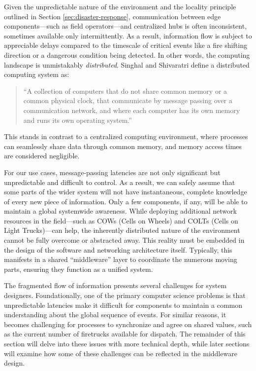 \documentclass[]             %
{NASA}                       %
\theoremstyle{definition}
\begin{document}
Given the unpredictable nature of the environment and the locality
principle outlined in Section \ref{sec:disaster-response},
communication between edge components---such as field operators---and
centralized hubs is often inconsistent, sometimes available only
intermittently. As a result, information flow is subject to
appreciable delays compared to the timescale of critical events like a
fire shifting direction or a dangerous condition being detected. In
other words, the computing landscape is unmistakably
\emph{distributed}. Singhal and Shivaratri \cite{10.5555/562065}
define a distributed computing system as:
\begin{quote}
  ``A collection of computers that do not share common
  memory or a common physical clock, that communicate by message
  passing over a communication network, and where each computer has
  its own memory and runs its own operating system.''
\end{quote}
This stands in contrast to a centralized computing environment, where
processes can seamlessly share data through common memory, and memory
access times are considered negligible.

For our use cases, message-passing latencies are not only significant
but unpredictable and difficult to control. As a result, we can safely
assume that some parts of the wider system will not have
instantaneous, complete knowledge of every new piece of
information. Only a few components, if any, will be able to maintain a
global systemwide awareness. While deploying additional network
resources in the field—such as COWs (Cells on Wheels) and COLTs (Cells
on Light Trucks)—can help, the inherently distributed nature of the
environment cannot be fully overcome or abstracted away. This reality
must be embedded in the design of the software and networking
architecture itself. Typically, this manifests in a shared
``middleware'' layer to coordinate the numerous moving parts, ensuring
they function as a unified system.

The fragmented flow of information presents several challenges for
system designers. Foundationally, one of the primary computer science
problems is that unpredictable latencies make it difficult for
components to maintain a common understanding about the global
sequence of events. For similar reasons, it becomes challenging for
processes to synchronize and agree on shared values, such as the
current number of firetrucks available for dispatch. The remainder of
this section will delve into these issues with more technical depth,
while later sections will examine how some of these challenges can be
reflected in the middleware design.
\end{document}
